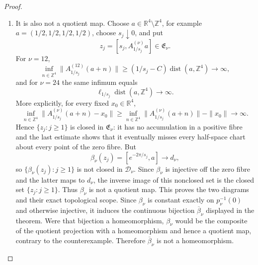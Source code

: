\begin{proof}
\begin{enumerate}[label=\arabic*.,leftmargin=*]
\item It is also not a quotient map.  Choose
\(a\in\mathbb R^4\setminus\mathbb Z^4\), for example
\(a=(1/2,1/2,1/2,1/2)\), choose \(s_j\downarrow0\), and put
\[
 z_j=[s_j,A_{1/s_j}^{(\nu)}a]\in\mathfrak E_\nu.
\]
For \(\nu=12\),
\[
 \inf_{n\in\mathbb Z^4}
 \|A_{1/s_j}^{(12)}(a+n)\|
 \geq(1/s_j-C)\operatorname{dist}(a,\mathbb Z^4)
 \longrightarrow\infty,
\]
and for \(\nu=24\) the same infimum equals
\[
 \ell_{1/s_j}\operatorname{dist}(a,\mathbb Z^4)
 \longrightarrow\infty.
\]
More explicitly, for every fixed \(x_0\in\mathbb R^4\),
\[
 \inf_{n\in\mathbb Z^4}
 \|A_{1/s_j}^{(\nu)}(a+n)-x_0\|
 \geq
 \inf_{n\in\mathbb Z^4}\|A_{1/s_j}^{(\nu)}(a+n)\|-\|x_0\|
 \longrightarrow\infty.
\]
Hence \(\{z_j:j\geq1\}\) is closed in \(\mathfrak E_\nu\): it has no
accumulation in a positive fibre and the last estimate shows that it
eventually misses every half-space chart about every point of the zero
fibre.  But
\[
 \beta_\nu(z_j)=[e^{-2\pi/s_j},a]\longrightarrow d_\nu,
\]
so \(\{\beta_\nu(z_j):j\geq1\}\) is not closed in \(\mathcal D_\nu\).
Since \(\beta_\nu\) is injective off the zero fibre and the latter maps to
\(d_\nu\), the inverse image of this nonclosed set is the closed set
\(\{z_j:j\geq1\}\).  Thus \(\beta_\nu\) is not a quotient map.  This proves
the two diagrams and their exact topological scope.  Since \(\beta_\nu\) is
constant exactly on \(p_\nu^{-1}(0)\) and otherwise injective, it induces the
continuous bijection \(\overline\beta_\nu\) displayed in the theorem.  Were
that bijection a homeomorphism, \(\beta_\nu\) would be the composite of the
quotient projection with a homeomorphism and hence a quotient map, contrary
to the counterexample.  Therefore \(\overline\beta_\nu\) is not a
homeomorphism.
\end{enumerate}
\end{proof}


